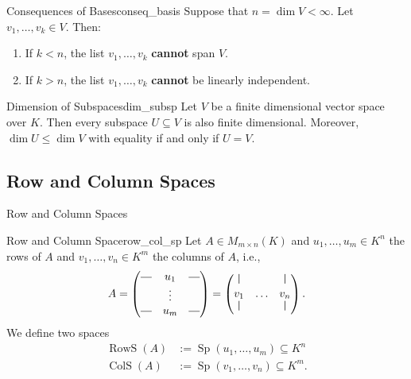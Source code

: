 \begin{theorem}{Consequences of Bases}{conseq_basis}
	Suppose that $n = \dim V < \infty$. Let $v_1, \hdots , v_k \in V$. Then:
	\begin{enumerate}
		\item[(1)] If $k < n$, the list $v_1, \hdots , v_k$ \textbf{cannot} span $V$.
		\item[(2)] If $k > n$, the list $v_1, \hdots , v_k$ \textbf{cannot} be linearly independent.
	\end{enumerate}
\end{theorem}

\begin{proposition}{Dimension of Subspaces}{dim_subsp}
	Let $V$ be a finite dimensional vector space over $K$. Then every subspace $U \subseteq V$ is also finite dimensional. Moreover, $\dim U \leq \dim V$ with equality if and only if $U = V$.
\end{proposition}


\subsection{Row and Column Spaces}{Row and Column Spaces}

\begin{definition}{Row and Column Space}{row_col_sp}
	Let $A \in M_{m\times n}(K)$ and $u_1, \hdots , u_m \in K^n$ the rows of $A$ and $v_1, \hdots , v_n \in K^m$ the columns of $A$, i.e.,
	\[
		A =
		\begin{pmatrix}
			\rule[0.5ex]{1em}{0.4pt} & u_1 & \rule[0.5ex]{1em}{0.4pt}\\
			& \vdots & \\
			\rule[0.5ex]{1em}{0.4pt} & u_m & \rule[0.5ex]{1em}{0.4pt}
		\end{pmatrix}
		= 
		\begin{pmatrix}
			\rule{0.5pt}{2ex} & & \rule{0.5pt}{2ex}\\
			v_1 & \hdots & v_n\\
			\rule{0.5pt}{2ex} & & \rule{0.5pt}{2ex}\\
		\end{pmatrix}.
	\]
	We define two spaces
	\begin{align*}
		\operatorname{RowS}(A) &:= \operatorname{Sp}(u_1, \hdots , u_m) \subseteq K^n\\
		\operatorname{ColS}(A) &:= \operatorname{Sp}(v_1, \hdots , v_n) \subseteq K^m.
	\end{align*}
\end{definition}

